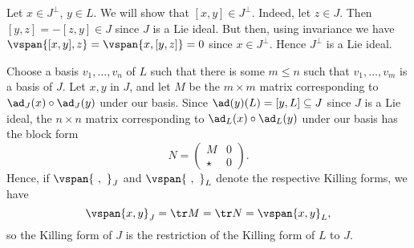 Let $x \in J^\perp$, $y \in L$.
We will show that $[x, y] \in J^\perp$. Indeed, let $z \in J$.
Then  $[y, z] = -[z, y] \in J$ since $J$ is a Lie ideal. But then, using
invariance we have
$\vspan{[x, y], z} = \vspan{x, [y, z]} = 0$ since $x \in J^\perp$. Hence $J^\perp$
is a Lie ideal.

Choose a basis $v_1, \ldots, v_n$ of $L$ such that there is some $m \leq n$
such that $v_1, \ldots, v_m$ is a basis of $J$. Let $x, y$ in $J$, and let $M$ be
the $m\times m$ matrix corresponding to $\ad_J(x) \circ \ad_J(y)$ under our basis. Since
$\ad(y)(L)  = [y, L] \subseteq J$ since $J$ is a Lie ideal, the $n\times n$ matrix
corresponding to $\ad_L(x) \circ \ad_L(y)$ under our basis has the
block form
\[ N = \begin{pmatrix}M & 0\\\star&0\end{pmatrix}. \]
Hence, if $\vspan{\ ,\ }_J$ and $\vspan{\ ,\ }_L$ denote the respective
Killing forms, we have
\[ \vspan{x, y}_J = \tr M = \tr N = \vspan{x, y}_L, \]
so the Killing form of $J$ is the restriction of the Killing form of $L$ to $J$.
